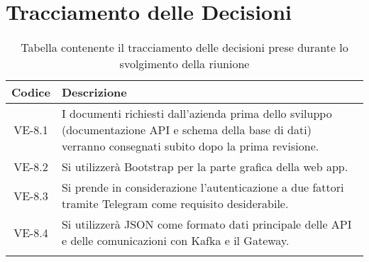\section*{Tracciamento delle Decisioni}

\begin{center}
	\begin{longtable}{|c|p{14.5cm}|}
	\hline
	\rowcolor{lighter-grayer}
	\textbf{Codice} & \textbf{Descrizione} \\
	\hline
	\endfirsthead
	
	\hline
	VE-8.1 & I documenti richiesti dall'azienda prima dello sviluppo (documentazione API e schema della base di dati) verranno consegnati subito dopo la prima revisione. \\
	\hline
	VE-8.2 & Si utilizzerà Bootstrap per la parte grafica della web app. \\
	\hline
	VE-8.3 & Si prende in considerazione l'autenticazione a due fattori tramite Telegram come requisito desiderabile. \\
	\hline
	VE-8.4 & Si utilizzerà JSON come formato dati principale delle API e delle comunicazioni con Kafka e il Gateway. \\
	\hline
	\caption{Tabella contenente il tracciamento delle decisioni prese durante lo svolgimento della riunione}
	\end{longtable}
\end{center}
